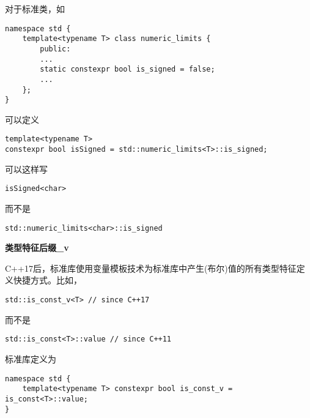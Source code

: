 对于标准类，如

\begin{lstlisting}[style=styleCXX]
namespace std {
	template<typename T> class numeric_limits {
		public:
		...
		static constexpr bool is_signed = false;
		...
	};
}
\end{lstlisting}

可以定义

\begin{lstlisting}[style=styleCXX]
template<typename T>
constexpr bool isSigned = std::numeric_limits<T>::is_signed;
\end{lstlisting}

可以这样写

\begin{lstlisting}[style=styleCXX]
isSigned<char>
\end{lstlisting}

而不是

\begin{lstlisting}[style=styleCXX]
std::numeric_limits<char>::is_signed
\end{lstlisting}

\noindent
\textbf{类型特征后缀\_v}

C++17后，标准库使用变量模板技术为标准库中产生(布尔)值的所有类型特征定义快捷方式。比如，

\begin{lstlisting}[style=styleCXX]
std::is_const_v<T> // since C++17
\end{lstlisting}

而不是

\begin{lstlisting}[style=styleCXX]
std::is_const<T>::value // since C++11
\end{lstlisting}

标准库定义为

\begin{lstlisting}[style=styleCXX]
namespace std {
	template<typename T> constexpr bool is_const_v = is_const<T>::value;
}
\end{lstlisting}






















